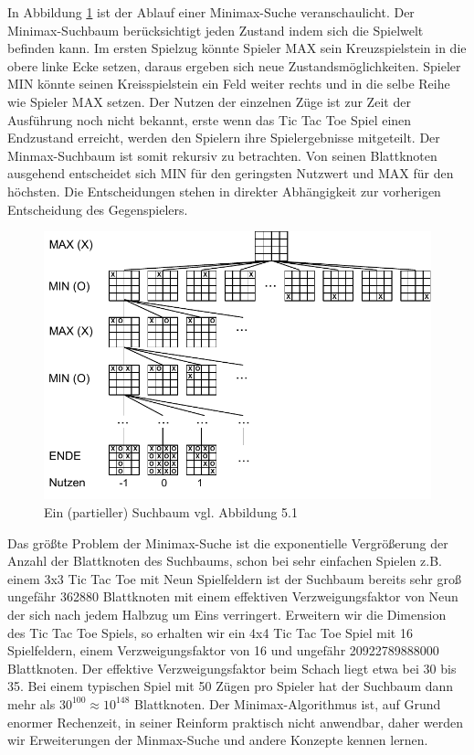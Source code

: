 In Abbildung \ref{fig:minimax_tictactoe} ist der Ablauf einer Minimax-Suche veranschaulicht. Der Minimax-Suchbaum berücksichtigt jeden Zustand indem sich die Spielwelt befinden kann. Im ersten Spielzug könnte Spieler MAX sein Kreuzspielstein in die obere linke Ecke setzen, daraus ergeben sich neue Zustandsmöglichkeiten. Spieler MIN könnte seinen Kreisspielstein ein Feld weiter rechts und in die selbe Reihe wie Spieler MAX setzen. Der Nutzen der einzelnen Züge ist zur Zeit der Ausführung noch nicht bekannt, erste wenn das Tic Tac Toe Spiel einen Endzustand erreicht, werden den Spielern ihre Spielergebnisse mitgeteilt. Der Minmax-Suchbaum ist somit rekursiv zu betrachten. Von seinen Blattknoten ausgehend entscheidet sich MIN für den geringsten Nutzwert und MAX für den höchsten. Die Entscheidungen stehen in direkter Abhängigkeit zur vorherigen Entscheidung des Gegenspielers. \\
  
\begin{figure}[!htbp]
  \centering
  \includegraphics{inhalt/abbildungen/minimax_tictactoe.pdf}
  \caption{Ein (partieller) Suchbaum vgl. Abbildung 5.1 \cite[208]{Russell}}
  \label{fig:minimax_tictactoe}
\end{figure} 

Das größte Problem der Minimax-Suche ist die exponentielle Vergrößerung der Anzahl der Blattknoten des Suchbaums, schon bei sehr einfachen Spielen z.B. einem 3x3 Tic Tac Toe mit Neun Spielfeldern ist der Suchbaum bereits sehr groß ungefähr 362880 Blattknoten mit einem effektiven Verzweigungsfaktor von Neun der sich nach jedem Halbzug um Eins verringert. Erweitern wir die Dimension des Tic Tac Toe Spiels, so erhalten wir ein 4x4 Tic Tac Toe Spiel mit 16 Spielfeldern, einem Verzweigungsfaktor von 16 und ungefähr 20922789888000 Blattknoten. Der effektive Verzweigungsfaktor beim Schach liegt etwa bei 30 bis 35. Bei einem typischen Spiel mit 50 Zügen pro Spieler hat der Suchbaum dann mehr als $30^{100} \approx 10^{148}$ Blattknoten\cite[114]{Ertel}. Der Minimax-Algorithmus ist, auf Grund enormer Rechenzeit, in seiner Reinform praktisch nicht anwendbar, daher werden wir Erweiterungen der Minmax-Suche und andere Konzepte kennen lernen.

